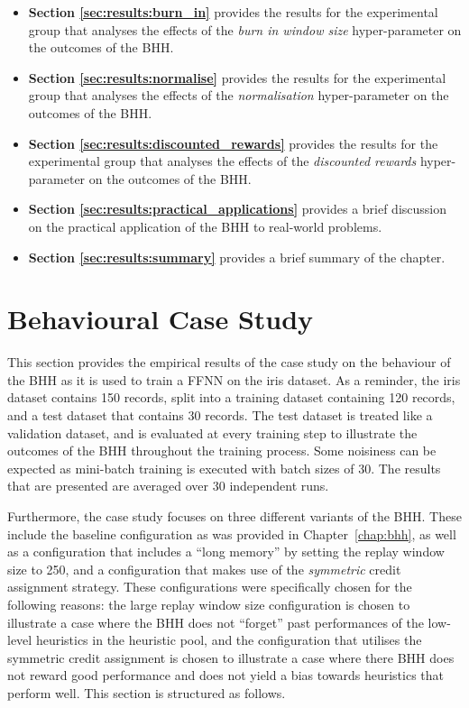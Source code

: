 \begin{itemize}
	\item \textbf{Section \ref{sec:results:burn_in}} provides the results for the experimental group that analyses the effects of the \textit{burn in window size} hyper-parameter on the outcomes of the \acs{BHH}.

	\item \textbf{Section \ref{sec:results:normalise}} provides the results for the experimental group that analyses the effects of the \textit{normalisation} hyper-parameter on the outcomes of the \acs{BHH}.

	\item \textbf{Section \ref{sec:results:discounted_rewards}} provides the results for the experimental group that analyses the effects of the \textit{discounted rewards} hyper-parameter on the outcomes of the \acs{BHH}.

	\item \textbf{Section \ref{sec:results:practical_applications}} provides a brief discussion on the practical application of the \acs{BHH} to real-world problems.

	\item \textbf{Section \ref{sec:results:summary}} provides a brief summary of the chapter.
\end{itemize}

\section{Behavioural Case Study}\label{sec:results:case_study}

This section provides the empirical results of the case study on the behaviour of the \acs{BHH} as it is used to train a \acs{FFNN} on the iris dataset. As a reminder, the iris dataset contains 150 records, split into a training dataset containing 120 records, and a test dataset that contains 30 records. The test dataset is treated like a validation dataset, and is evaluated at every training step to illustrate the outcomes of the \acs{BHH} throughout the training process. Some noisiness can be expected as mini-batch training is executed with batch sizes of 30. The results that are presented are averaged over 30 independent runs.

Furthermore, the case study focuses on three different variants of the \acs{BHH}. These include the baseline configuration as was provided in Chapter~\ref{chap:bhh}, as well as a configuration that includes a ``long memory'' by setting the replay window size to 250, and a configuration that makes use of the \textit{symmetric} credit assignment strategy. These configurations were specifically chosen for the following reasons: the large replay window size configuration is chosen to illustrate a case where the \acs{BHH} does not ``forget'' past performances of the low-level heuristics in the heuristic pool, and the configuration that utilises the symmetric credit assignment is chosen to illustrate a case where there \acs{BHH} does not reward good performance and does not yield a bias towards heuristics that perform well. This section is structured as follows.

